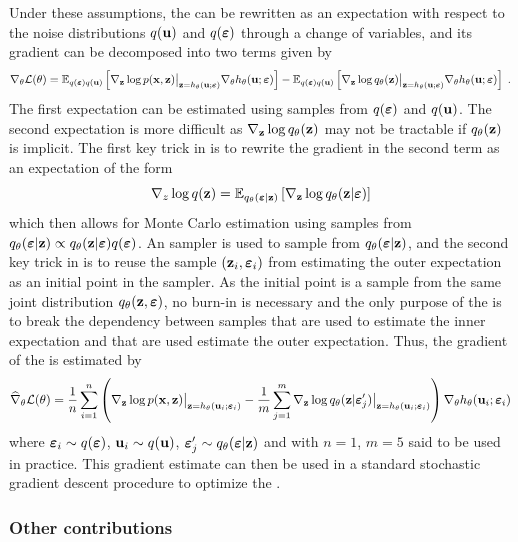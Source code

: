 \documentclass[10pt]{article}
\begin{document}
Under these assumptions, the \elbo can be rewritten as an expectation with respect to the noise distributions $q(\mathbf{u})$ and $q(\bm{\varepsilon})$ through a change of variables, and its gradient can be decomposed into two terms given by
\[
\nabla_\theta \mathcal{L}(\theta) = \mathbb{E}_{q(\bm{\varepsilon})q(\mathbf{u})}\left[\nabla_{\mathbf{z}} \log p(\mathbf{x},\mathbf{z})\big|_{\mathbf{z}=h_\theta(\mathbf{u};\bm{\varepsilon})}\nabla_\theta h_\theta(\mathbf{u};\bm{\varepsilon})\right] - \mathbb{E}_{q(\bm{\varepsilon})q(\mathbf{u})}\left[\nabla_{\mathbf{z}} \log q_\theta(\mathbf{z})\big|_{\mathbf{z}=h_\theta(\mathbf{u};\bm{\varepsilon})}\nabla_\theta h_\theta(\mathbf{u};\bm{\varepsilon})\right] \;.
\]
The first expectation can be estimated using samples from $q(\bm{\varepsilon})$ and $q(\mathbf{u})$. The second expectation is more difficult as $\nabla_{\mathbf{z}}\log q_\theta(\mathbf{z})$ may not be tractable if $q_\theta(\mathbf{z})$ is implicit. The first key trick in \uivi is to rewrite the gradient in the second term as an expectation of the form
\[
\nabla_z\log q(\mathbf{z}) = \mathbb{E}_{q_\theta(\bm{\varepsilon}|\mathbf{z})}\left[\nabla_{\mathbf{z}}\log q_\theta(\mathbf{z}|\bm{\varepsilon})\right]
\]
which then allows for Monte Carlo estimation using samples from $q_\theta(\bm{\varepsilon}|\mathbf{z})\propto q_\theta(\mathbf{z}|\bm{\varepsilon})q(\bm{\varepsilon})$. An \mcmc sampler is used to sample from $q_\theta(\bm{\varepsilon}|\mathbf{z})$, and the second key trick in \uivi is to reuse the sample $(\mathbf{z}_i,\bm{\varepsilon}_i)$ from estimating the outer expectation as an initial point in the \mcmc sampler. As the initial point is a sample from the same joint distribution $q_\theta(\mathbf{z},\bm{\varepsilon})$, no burn-in is necessary and the only purpose of the \mcmc is to break the dependency between samples that are used to estimate the inner expectation and that are used estimate the outer expectation. Thus, the gradient of the \elbo is estimated by
\[
\widehat{\nabla}_\theta\mathcal{L}(\theta) = \frac{1}{n}\sum_{i=1}^n \left(\nabla_{\mathbf{z}}\log p(\mathbf{x},\mathbf{z})\big|_{\mathbf{z}=h_\theta(\mathbf{u}_i;\bm{\varepsilon}_i)} - \frac{1}{m}\sum_{j=1}^m \nabla_{\mathbf{z}}\log q_\theta(\mathbf{z}|\bm{\varepsilon}_j')\big|_{\mathbf{z}=h_\theta(\mathbf{u}_i;\bm{\varepsilon}_i)} \right)\nabla_\theta h_\theta(\mathbf{u}_i;\bm{\varepsilon}_i)
\]
where $\bm{\varepsilon}_i\sim q(\bm{\varepsilon})$, $\mathbf{u}_i\sim q(\mathbf{u})$, $\bm{\varepsilon}_j'\sim q_\theta(\bm{\varepsilon}|\mathbf{z})$ and with $n=1$, $m=5$ said to be used in practice. This gradient estimate can then be used in a standard stochastic gradient descent procedure to optimize the \elbo.

\subsubsection{Other contributions}
\end{document}
